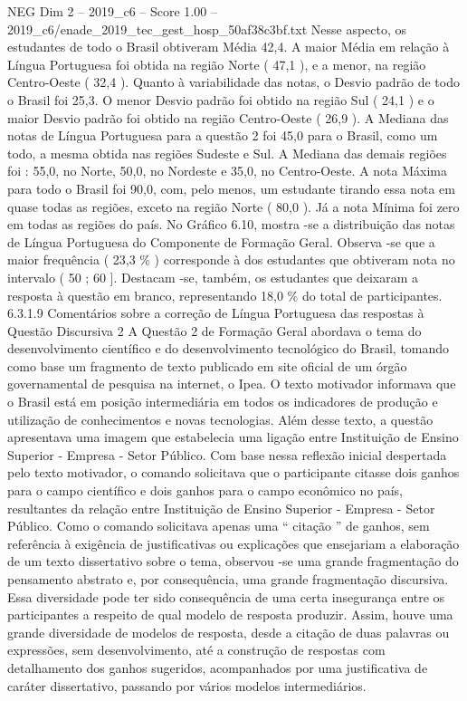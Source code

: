 \begin{textsample}{NEG Dim 2 – 2019\_c6 – Score 1.00 – 2019\_c6/enade\_2019\_tec\_gest\_hosp\_50af38c3bf.txt}
Nesse aspecto, os estudantes de todo o Brasil obtiveram Média 42,4.
A maior Média em relação à Língua Portuguesa foi obtida na região Norte ( 47,1 ), e a menor, na região Centro-Oeste ( 32,4 ).
Quanto à variabilidade das notas, o Desvio padrão de todo o Brasil foi 25,3.
O menor Desvio padrão foi obtido na região Sul ( 24,1 ) e o maior Desvio padrão foi obtido na região Centro-Oeste ( 26,9 ).
A Mediana das notas de Língua Portuguesa para a questão 2 foi 45,0 para o Brasil, como um todo, a mesma obtida nas regiões Sudeste e Sul.
A Mediana das demais regiões foi : 55,0, no Norte, 50,0, no Nordeste e 35,0, no Centro-Oeste.
A nota Máxima para todo o Brasil foi 90,0, com, pelo menos, um estudante tirando essa nota em quase todas as regiões, exceto na região Norte ( 80,0 ).
Já a nota Mínima foi zero em todas as regiões do país.
No Gráfico 6.10, mostra -se a distribuição das notas de Língua Portuguesa do Componente de Formação Geral.
Observa -se que a maior frequência ( 23,3 \% ) corresponde à dos estudantes que obtiveram nota no intervalo ( 50 ; 60 ].
Destacam -se, também, os estudantes que deixaram a resposta à questão em branco, representando 18,0 \% do total de participantes. 6.3.1.9 Comentários sobre a correção de Língua Portuguesa das respostas à Questão Discursiva 2 A Questão 2 de Formação Geral abordava o tema do desenvolvimento científico e do desenvolvimento tecnológico do Brasil, tomando como base um fragmento de texto publicado em site oficial de um órgão governamental de pesquisa na internet, o Ipea.
O texto motivador informava que o Brasil está em posição intermediária em todos os indicadores de produção e utilização de conhecimentos e novas tecnologias.
Além desse texto, a questão apresentava uma imagem que estabelecia uma ligação entre Instituição de Ensino Superior - Empresa - Setor Público.
Com base nessa reflexão inicial despertada pelo texto motivador, o comando solicitava que o participante citasse dois ganhos para o campo científico e dois ganhos para o campo econômico no país, resultantes da relação entre Instituição de Ensino Superior - Empresa - Setor Público.
Como o comando solicitava apenas uma “ citação ” de ganhos, sem referência à exigência de justificativas ou explicações que ensejariam a elaboração de um texto dissertativo sobre o tema, observou -se uma grande fragmentação do pensamento abstrato e, por consequência, uma grande fragmentação discursiva.
Essa diversidade pode ter sido consequência de uma certa insegurança entre os participantes a respeito de qual modelo de resposta produzir.
Assim, houve uma grande diversidade de modelos de resposta, desde a citação de duas palavras ou expressões, sem desenvolvimento, até a construção de respostas com detalhamento dos ganhos sugeridos, acompanhados por uma justificativa de caráter dissertativo, passando por vários modelos intermediários.

\end{textsample}
